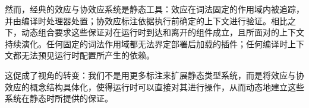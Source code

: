 然而，经典的效应与协效应系统是静态工具：效应在词法固定的作用域内被追踪，并由编译时处理器处置；协效应标注依据执行前确定的上下文进行验证。相比之下，动态组合要求这些保证对在运行时到达和离开的组件成立，且所面对的上下文持续演化。任何固定的词法作用域都无法界定部署后加载的插件；任何编译时上下文都无法预见运行时配置所产生的依赖。

这促成了视角的转变：我们不是用更多标注来扩展静态类型系统，而是将效应与协效应的概念结构具体化，使得运行时可以直接对其进行操作，从而动态地建立这些系统在静态时所提供的保证。